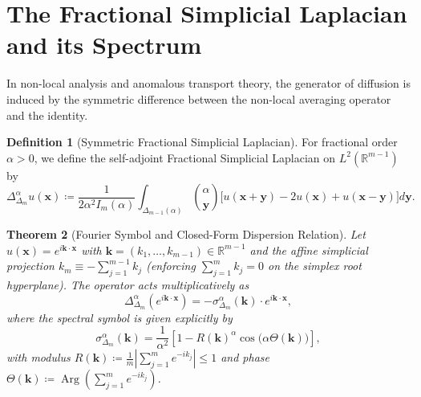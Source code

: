 \documentclass[11pt,a4paper]{article}
\theoremstyle{plain}
\newtheorem{theorem}{Theorem}[section]
\theoremstyle{definition}
\newtheorem{definition}[theorem]{Definition}
\theoremstyle{remark}
\numberwithin{equation}{section}
\begin{document}
\section{The Fractional Simplicial Laplacian and its Spectrum}

In non-local analysis and anomalous transport theory, the generator of diffusion is induced by the symmetric difference between the non-local averaging operator and the identity.

\begin{definition}[Symmetric Fractional Simplicial Laplacian]
For fractional order $\alpha > 0$, we define the self-adjoint Fractional Simplicial Laplacian on $L^2(\mathbb{R}^{m-1})$ by
\begin{equation}
\Delta_{\Delta_m}^\alpha u(\mathbf{x}) \coloneqq \frac{1}{2\alpha^2 I_m(\alpha)}\int_{\Delta_{m-1}(\alpha)} \binom{\alpha}{\mathbf{y}} \Big[u(\mathbf{x}+\mathbf{y}) - 2u(\mathbf{x}) + u(\mathbf{x}-\mathbf{y})\Big] d\mathbf{y}.
\end{equation}
\end{definition}

\begin{theorem}[Fourier Symbol and Closed-Form Dispersion Relation]
\label{thm:laplacian_symbol}
Let $u(\mathbf{x}) = e^{i\mathbf{k}\cdot\mathbf{x}}$ with $\mathbf{k} = (k_1, \dots, k_{m-1}) \in \mathbb{R}^{m-1}$ and the affine simplicial projection $k_m \equiv -\sum_{j=1}^{m-1} k_j$ (enforcing $\sum_{j=1}^m k_j = 0$ on the simplex root hyperplane). The operator acts multiplicatively as
\begin{equation}
\Delta_{\Delta_m}^\alpha \left(e^{i\mathbf{k}\cdot\mathbf{x}}\right) = -\sigma_{\Delta_m}^\alpha(\mathbf{k}) \cdot e^{i\mathbf{k}\cdot\mathbf{x}},
\end{equation}
where the spectral symbol is given explicitly by
\begin{equation}
\sigma_{\Delta_m}^\alpha(\mathbf{k}) = \frac{1}{\alpha^2}\left[1 - R(\mathbf{k})^\alpha \cos\big(\alpha \Theta(\mathbf{k})\big)\right],
\end{equation}
with modulus $R(\mathbf{k}) \coloneqq \frac{1}{m}\left|\sum_{j=1}^m e^{-ik_j}\right| \le 1$ and phase $\Theta(\mathbf{k}) \coloneqq \operatorname{Arg}\left(\sum_{j=1}^m e^{-ik_j}\right)$.
\end{theorem}
\end{document}
